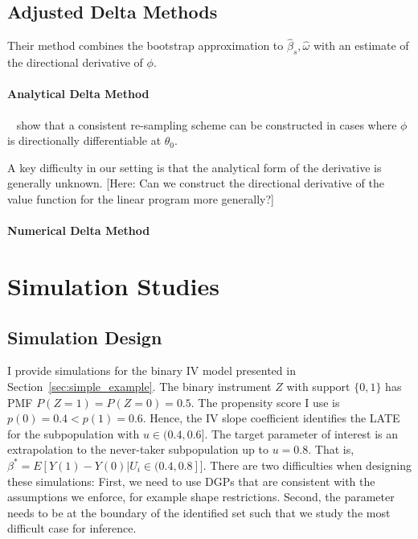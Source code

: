 \documentclass[12pt,a4paper,english]{article} %
\numberwithin{equation}{section}
\theoremstyle{definition}
\theoremstyle{remark}
\theoremstyle{plain}
\begin{document}
\subsection{Adjusted Delta Methods}
Their method combines the bootstrap approximation to $\hat{\beta}_s, \hat{\omega}$ with an estimate of the directional derivative of $\phi$.

\paragraph{Analytical Delta Method}
~\cite{fang2019infdirdiff} show that a consistent re-sampling scheme can be constructed in cases where $\phi$ is directionally differentiable at $\theta_0$.

A key difficulty in our setting is that the analytical form of the derivative is generally unknown.
[Here: Can we construct the directional derivative of the value function for the linear program more generally?]

\paragraph{Numerical Delta Method}

\section{Simulation Studies}\label{sec:simulation_studies}

\subsection{Simulation Design}
I provide simulations for the binary IV model presented in Section~\ref{sec:simple_example}.
The binary instrument $Z$ with support $\{0,1\}$ has PMF $P(Z=1) = P(Z=0) = 0.5$.
The propensity score I use is $p(0) = 0.4 < p(1) = 0.6$.
Hence, the IV slope coefficient identifies the LATE for the subpopulation with $u\in(0.4, 0.6]$.
The target parameter of interest is an extrapolation to the never-taker subpopulation up to $u=0.8$.
That is, $\beta^* = E[Y(1) - Y(0) | U_i \in (0.4, 0.8]]$.
There are two difficulties when designing these simulations: First, we need to use DGPs that are consistent with the assumptions we enforce, for example shape restrictions.
Second, the parameter needs to be at the boundary of the identified set such that we study the most difficult case for inference.
\end{document}
